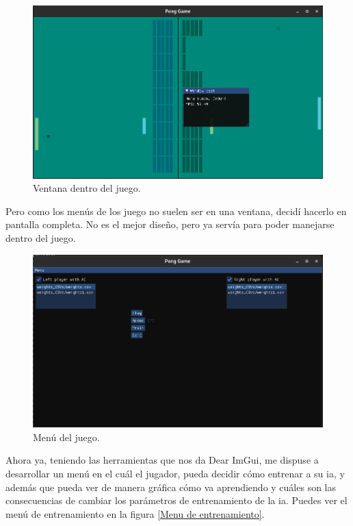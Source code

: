 \begin{figure}[H]
	\centering
	\includegraphics[width=15cm]{archivos/imagenes/ventana-dentro-del-juego.png}
	\caption{Ventana dentro del juego.}
\end{figure}
Pero como los menús de los juego no suelen ser en una ventana, decidí hacerlo en pantalla completa. No es el mejor diseño, pero ya servía para poder manejarse  dentro del juego.
\begin{figure}[H]
	\centering
	\includegraphics[width=15cm]{archivos/imagenes/menu-del-juego.png}
	\caption{Menú del juego.}
	\label{Menu del juego}
\end{figure}
Ahora ya, teniendo las herramientas que nos da Dear ImGui, me dispuse a desarrollar un menú en el cuál el jugador, pueda decidir cómo entrenar a su \gls{ia}, y además que pueda ver de manera gráfica cómo va aprendiendo y cuáles son las consecuencias de cambiar los parámetros de entrenamiento de la \gls{ia}. Puedes ver el menú de entrenamiento en la figura \ref{Menu de entrenamiento}.

